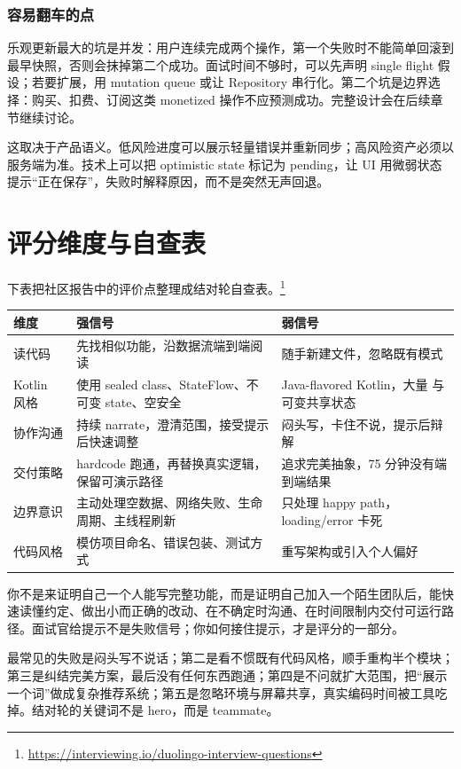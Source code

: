 \subsubsection*{容易翻车的点}

乐观更新最大的坑是并发：用户连续完成两个操作，第一个失败时不能简单回滚到最早快照，否则会抹掉第二个成功。面试时间不够时，可以先声明 single flight 假设；若要扩展，用 mutation queue 或让 Repository 串行化。第二个坑是边界选择：购买、扣费、订阅这类 monetized 操作不应预测成功。完整设计会在后续章节继续讨论。

\begin{followup}
这取决于产品语义。低风险进度可以展示轻量错误并重新同步；高风险资产必须以服务端为准。技术上可以把 optimistic state 标记为 pending，让 UI 用微弱状态提示“正在保存”，失败时解释原因，而不是突然无声回退。
\end{followup}

\section{评分维度与自查表}

下表把社区报告中的评价点整理成结对轮自查表。\srccommunity\footnote{\url{https://interviewing.io/duolingo-interview-questions}}

\begin{center}
\begin{tabularx}{\linewidth}{@{}l X X@{}}
\toprule
\textbf{维度} & \textbf{强信号} & \textbf{弱信号} \\
\midrule
读代码 & 先找相似功能，沿数据流端到端阅读 & 随手新建文件，忽略既有模式 \\
Kotlin 风格 & 使用 sealed class、StateFlow、不可变 state、空安全 & Java-flavored Kotlin，大量 \code{!!} 与可变共享状态 \\
协作沟通 & 持续 narrate，澄清范围，接受提示后快速调整 & 闷头写，卡住不说，提示后辩解 \\
交付策略 & hardcode 跑通，再替换真实逻辑，保留可演示路径 & 追求完美抽象，75 分钟没有端到端结果 \\
边界意识 & 主动处理空数据、网络失败、生命周期、主线程刷新 & 只处理 happy path，loading/error 卡死 \\
代码风格 & 模仿项目命名、错误包装、测试方式 & 重写架构或引入个人偏好 \\
\bottomrule
\end{tabularx}
\end{center}

\begin{keypoint}[75 分钟的目标]
你不是来证明自己一个人能写完整功能，而是证明自己加入一个陌生团队后，能快速读懂约定、做出小而正确的改动、在不确定时沟通、在时间限制内交付可运行路径。面试官给提示不是失败信号；你如何接住提示，才是评分的一部分。
\end{keypoint}

\begin{pitfall}[经典失败模式]
最常见的失败是闷头写不说话；第二是看不惯既有代码风格，顺手重构半个模块；第三是纠结完美方案，最后没有任何东西跑通；第四是不问就扩大范围，把“展示一个词”做成复杂推荐系统；第五是忽略环境与屏幕共享，真实编码时间被工具吃掉。结对轮的关键词不是 hero，而是 teammate。
\end{pitfall}
